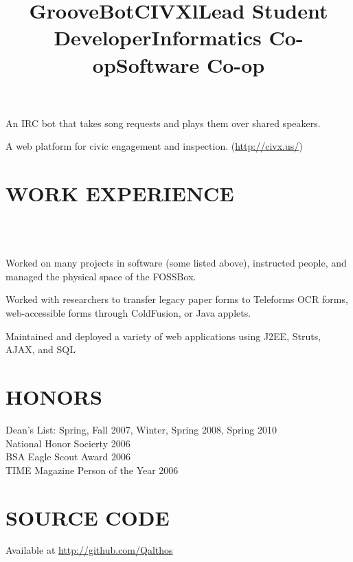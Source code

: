 \documentclass[line]{res}
\begin{document}
\begin{resume}
    \title{GrooveBot}
    \begin{position}
        An IRC bot that takes song requests and plays them over shared speakers.
    \end{position}

    \title{CIVX}
    \begin{position}
        A web platform for civic engagement and inspection.
        (\url{http://civx.us/})
    \end{position}

\section{WORK EXPERIENCE}
    \begin{format}
        \title{l}\\
        \\
        \body
    \end{format}

    \title{Lead Student Developer}
    \begin{position}
        Worked on many projects in software (some listed above), instructed
        people, and managed the physical space of the FOSSBox.
    \end{position}

    \title{Informatics Co-op}
    \begin{position}
        Worked with researchers to transfer legacy paper forms to Teleforms OCR
        forms, web-accessible forms through ColdFusion, or Java applets.
    \end{position}

    \title{Software Co-op}
    \begin{position}
        Maintained and deployed a variety of web applications using J2EE,
        Struts, AJAX, and SQL
    \end{position}

\section{HONORS}
    Dean's List: Spring, Fall 2007, Winter, Spring 2008, Spring 2010 \\
    National Honor Socierty 2006 \\
    BSA Eagle Scout Award 2006 \\
    TIME Magazine Person of the Year 2006 \\

\section{SOURCE CODE}
    Available at \url{http://github.com/Qalthos}\\

\end{resume}
\end{document}
